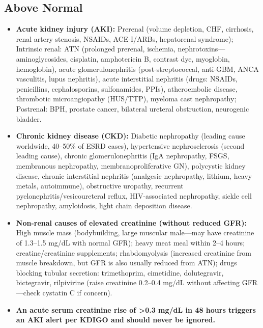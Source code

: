 \subsection*{Above Normal}
\begin{itemize}
  \item \textbf{Acute kidney injury (AKI):} Prerenal (volume depletion, CHF, cirrhosis, renal artery stenosis, NSAIDs, ACE-I/ARBs, hepatorenal syndrome); Intrinsic renal: ATN (prolonged prerenal, ischemia, nephrotoxins---aminoglycosides, cisplatin, amphotericin B, contrast dye, myoglobin, hemoglobin), acute glomerulonephritis (post-streptococcal, anti-GBM, ANCA vasculitis, lupus nephritis), acute interstitial nephritis (drugs: NSAIDs, penicillins, cephalosporins, sulfonamides, PPIs), atheroembolic disease, thrombotic microangiopathy (HUS/TTP), myeloma cast nephropathy; Postrenal: BPH, prostate cancer, bilateral ureteral obstruction, neurogenic bladder.
  \item \textbf{Chronic kidney disease (CKD):} Diabetic nephropathy (leading cause worldwide, 40--50\% of ESRD cases), hypertensive nephrosclerosis (second leading cause), chronic glomerulonephritis (IgA nephropathy, FSGS, membranous nephropathy, membranoproliferative GN), polycystic kidney disease, chronic interstitial nephritis (analgesic nephropathy, lithium, heavy metals, autoimmune), obstructive uropathy, recurrent pyelonephritis/vesicoureteral reflux, HIV-associated nephropathy, sickle cell nephropathy, amyloidosis, light chain deposition disease.
  \item \textbf{Non-renal causes of elevated creatinine (without reduced GFR):} High muscle mass (bodybuilding, large muscular male---may have creatinine of 1.3--1.5 mg/dL with normal GFR); heavy meat meal within 2--4 hours; creatine/creatinine supplements; rhabdomyolysis (increased creatinine from muscle breakdown, but GFR is also usually reduced from ATN); drugs blocking tubular secretion: trimethoprim, cimetidine, dolutegravir, bictegravir, rilpivirine (raise creatinine 0.2--0.4 mg/dL without affecting GFR---check cystatin C if concern).
  \item \textbf{An acute serum creatinine rise of >0.3 mg/dL in 48 hours triggers an AKI alert per KDIGO and should never be ignored.}
\end{itemize}

